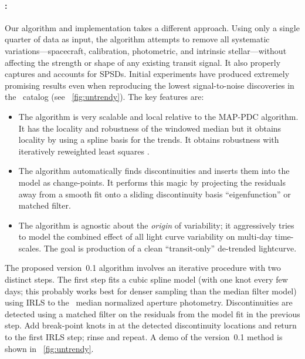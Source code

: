 \documentclass[letterpaper,12pt,preprint]{hack_aastex}
\newcommand{\Untrendy}{\package{Untrendy}}
\begin{document}
\paragraph{\Untrendy:}
Our algorithm and implementation takes a
different approach.
Using only a single quarter of data as input, the algorithm attempts to
remove all systematic variations---spacecraft, calibration, photometric, and
intrinsic stellar---without affecting the strength or shape of any existing
transit signal.
It also properly captures and accounts for SPSDs.
Initial experiments have produced extremely promising results even when
reproducing the lowest signal-to-noise discoveries in the \Kepler\ catalog
(see \figurename~\ref{fig:untrendy}).
The key features are:
\begin{itemize}
\item The algorithm is very scalable and local relative to the MAP-PDC
  algorithm.  It has the locality and robustness of the
  windowed median but
  it obtains locality by using a spline basis for the trends.  It obtains
  robustness with iteratively reweighted least squares \citep[IRLS; for
  example][]{blind}.
\item The algorithm automatically finds discontinuities and inserts
  them into the model as change-points.
  It performs this magic by projecting the residuals away from a smooth fit
  onto a sliding discontinuity basis ``eigenfunction'' or matched filter.
\item The algorithm is agnostic about the \emph{origin} of variability; it
  aggressively tries to model the combined effect of all light curve variability
  on multi-day time-scales.
  The goal is production of a clean ``transit-only'' de-trended lightcurve.
\end{itemize}

The proposed version~0.1 algorithm involves an iterative procedure with two
distinct steps.
The first step fits a cubic spline model (with one knot every few days; this
probably works best for denser sampling than the median filter model) using
IRLS to the \Kepler\ median normalized aperture photometry.
Discontinuities are detected using a matched filter on the residuals
from the model fit in the previous step.
Add break-point knots in at the detected discontinuity locations and return to the first IRLS
step; rinse and repeat.  A demo of the version~0.1 method is shown in
\figurename~\ref{fig:untrendy}.%
\end{document}
